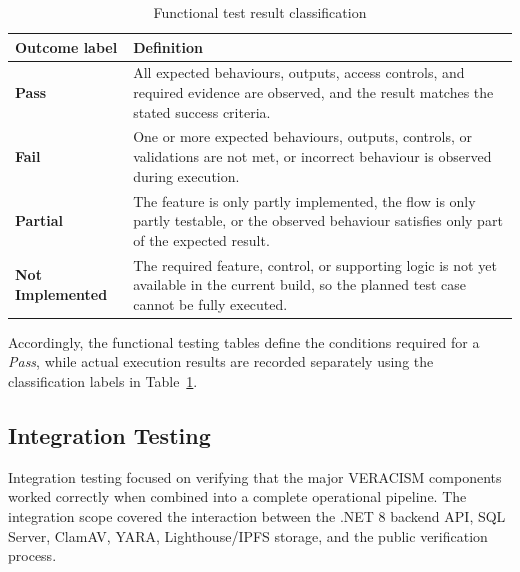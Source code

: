 \begin{table}[H]
  \centering
  \smalltable
  \footnotesize
  {%
  \setlength{\tabcolsep}{6pt}
  \renewcommand{\arraystretch}{1.3}
  \begin{tabular}{|>{\raggedright\arraybackslash}p{}|
                  >{\raggedright\arraybackslash}p{}|}
    \hline
    \textbf{Outcome label} & \textbf{Definition} \\
    \hline\hline

    \textbf{Pass} &
    All expected behaviours, outputs, access controls, and required evidence
    are observed, and the result matches the stated success criteria. \\
    \hline

    \textbf{Fail} &
    One or more expected behaviours, outputs, controls, or validations are not
    met, or incorrect behaviour is observed during execution. \\
    \hline

    \textbf{Partial} &
    The feature is only partly implemented, the flow is only partly testable,
    or the observed behaviour satisfies only part of the expected result. \\
    \hline

    \textbf{Not Implemented} &
    The required feature, control, or supporting logic is not yet available in
    the current build, so the planned test case cannot be fully executed. \\
    \hline

  \end{tabular}
  }%
  \captionsetup{type=table}
  \caption{Functional test result classification}
  \label{tab:functional-result-classification}
\end{table}

Accordingly, the functional testing tables define the conditions required for a
\textit{Pass}, while actual execution results are recorded separately using the
classification labels in Table~\ref{tab:functional-result-classification}.

\subsection{Integration Testing}

Integration testing focused on verifying that the major VERACISM components
worked correctly when combined into a complete operational pipeline. The
integration scope covered the interaction between the .NET 8 backend API,
SQL Server, ClamAV, YARA, Lighthouse/IPFS storage, and the public
verification process.

